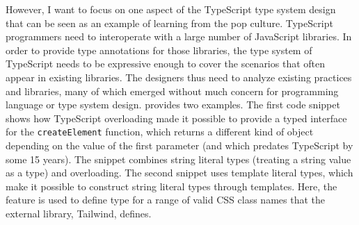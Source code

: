 However, I want to focus on one aspect of the TypeScript type system design that can be seen as an
example of learning from the pop culture. TypeScript programmers need to interoperate with a large
number of JavaScript libraries. In order to provide type annotations for those libraries,
the type system of TypeScript needs to be expressive enough to cover the scenarios that often
appear in existing libraries. The designers thus need to analyze existing practices and libraries,
many of which emerged without much concern for programming language or type system design.
 provides two examples. The first code snippet shows how TypeScript
overloading made it possible to provide a typed interface for the \texttt{createElement} function,
which returns a different kind of object depending on the value of the first parameter
(and which predates TypeScript by some 15 years). The snippet combines string literal types
(treating a string value as a type) and overloading.
The second snippet uses template literal types, which make it possible to construct string literal
types through templates. Here, the feature is used to define type for a range of valid CSS class
names that the external library, Tailwind, defines.


